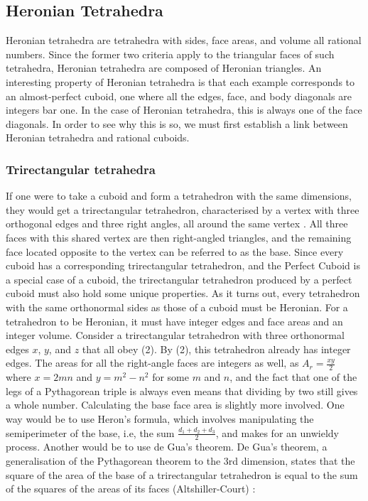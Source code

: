 \documentclass[11pt]{article}
\begin{document}
\subsection{Heronian Tetrahedra}
Heronian tetrahedra are tetrahedra with sides, face areas, and volume all rational numbers. Since the former two criteria apply to the triangular faces of such tetrahedra, Heronian tetrahedra are composed of Heronian triangles. An interesting property of Heronian tetrahedra is that each example corresponds to an almost-perfect cuboid, one where all the edges, face, and body diagonals are integers bar one. In the case of Heronian tetrahedra, this is always one of the face diagonals. In order to see why this is so, we must first establish a link between Heronian tetrahedra and rational cuboids.

\subsubsection{Trirectangular tetrahedra}
If one were to take a cuboid and form a tetrahedron with the same dimensions, they would get a trirectangular tetrahedron, characterised by a vertex with three orthogonal edges and three right angles, all around the same vertex \cite{trirec}. All three faces with this shared vertex are then right-angled triangles, and the remaining face located opposite to the vertex can be referred to as the base. 
Since every cuboid has a corresponding trirectangular tetrahedron, and the Perfect Cuboid is a special case of a cuboid, the trirectangular tetrahedron produced by a perfect cuboid must also hold some unique properties. As it turns out, every tetrahedron with the same orthonormal sides as those of a cuboid must be Heronian. For a tetrahedron to be Heronian, it must have integer edges and face areas and an integer volume.
Consider a trirectangular tetrahedron with three orthonormal edges $x$, $y$, and $z$ that all obey (2).
By (2), this tetrahedron already has integer edges. The areas for all the right-angle faces are integers as well, as $A_r=\frac{xy}{2}$ where $x=2mn$ and $y=m^2-n^2$ for some $m$ and $n$, and the fact that one of the legs of a Pythagorean triple is always even means that dividing by two still gives a whole number. 
Calculating the base face area is slightly more involved. One way would be to use Heron's formula, which involves manipulating the semiperimeter of the base, i.e, the sum $\frac{d_1+d_2+d_3}{2}$, and makes for an unwieldy process. Another would be to use de Gua's theorem. De Gua's theorem, a generalisation of the Pythagorean theorem to the 3rd dimension, states that the square of the area of the base of a trirectangular tetrahedron is equal to the sum of the squares of the areas of its faces (Altshiller-Court) \cite{degua}:
\end{document}
